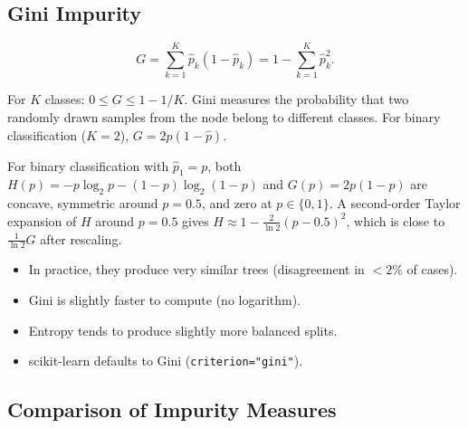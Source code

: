 \subsection{Gini Impurity}

\begin{definition}
\[
    G = \sum_{k=1}^{K}\hat{p}_k(1-\hat{p}_k) = 1 - \sum_{k=1}^{K}\hat{p}_k^2.
\]
\end{definition}

\begin{proposition}
For $K$ classes: $0 \leq G \leq 1 - 1/K$. Gini measures the probability that two randomly drawn samples from the node belong to different classes. For binary classification ($K=2$), $G = 2\hat{p}(1-\hat{p})$.
\end{proposition}

\begin{theorem}
For binary classification with $\hat{p}_1 = p$, both $H(p) = -p\log_2 p - (1-p)\log_2(1-p)$ and $G(p) = 2p(1-p)$ are concave, symmetric around $p=0.5$, and zero at $p \in \{0,1\}$. A second-order Taylor expansion of $H$ around $p=0.5$ gives $H \approx 1 - \frac{2}{\ln 2}(p-0.5)^2$, which is close to $\frac{1}{\ln 2}G$ after rescaling.
\end{theorem}

\begin{bestpractice}[title=\textbf{Entropy vs.\ Gini}]
\begin{itemize}
    \item In practice, they produce very similar trees (disagreement in $<2\%$ of cases).
    \item Gini is slightly faster to compute (no logarithm).
    \item Entropy tends to produce slightly more balanced splits.
    \item scikit-learn defaults to Gini (\texttt{criterion="gini"}).
\end{itemize}
\end{bestpractice}

\subsection{Comparison of Impurity Measures}

